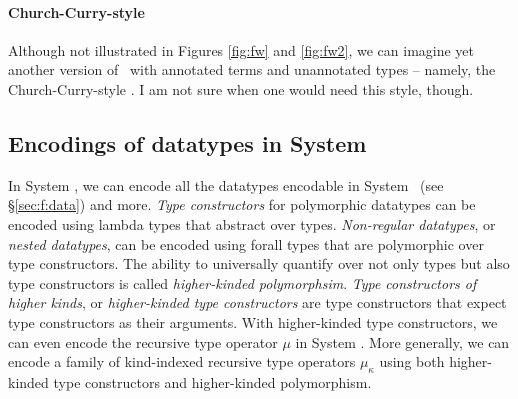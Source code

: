 \paragraph{Church-Curry-style \Fw}
Although not illustrated in Figures \ref{fig:fw} and \ref{fig:fw2},
we can imagine yet another version of \Fw\ with annotated terms
and unannotated types -- namely, the Church-Curry-style \Fw.
I am not sure when one would need this style, though.

\subsection{Encodings of datatypes in System \Fw}
\label{sec:fw:data}
In System \Fw, we can encode all the datatypes encodable in System \F\ (see
\S\ref{sec:f:data}) and more. \emph{Type constructors} for polymorphic datatypes
can be encoded using lambda types that abstract over types.
\emph{Non-regular datatypes}, or \emph{nested datatypes}, can be encoded
using forall types that are polymorphic over type constructors.
The ability to universally quantify over not only types but also
type constructors is called \emph{higher-kinded polymorphsim}.
\emph{Type constructors of higher kinds}, or \emph{higher-kinded
type constructors} are type constructors that expect type constructors
as their arguments. With higher-kinded type constructors, we can even encode
the recursive type operator $\mu$ in System \Fw. More generally, we can encode
a family of kind-indexed recursive type operators $\mu_\kappa$ using both
higher-kinded type constructors and higher-kinded polymorphism.

